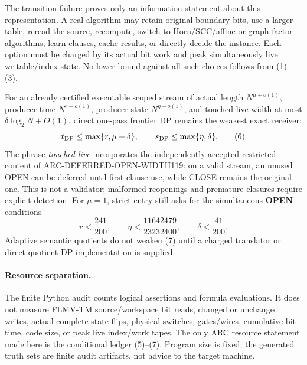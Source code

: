 \documentclass[11pt]{article}
\newcommand{\OPEN}{\textbf{OPEN}}
\begin{document}
The transition failure proves only an information statement about this
representation.  A real algorithm may retain original boundary bits, use a
larger table, reread the source, recompute, switch to Horn/SCC/affine or graph
factor algorithms, learn clauses, cache results, or directly decide the
instance.  Each option must be charged by its actual bit work and peak
simultaneously live writable/index state.  No lower bound against all such
choices follows from (1)--(3).

For an already certified executable scoped stream of actual length
$N^{\mu+o(1)}$, producer time $N^{r+o(1)}$, producer state
$N^{\eta+o(1)}$, and touched-live width at most
$\delta\log_2N+O(1)$, direct one-pass frontier DP remains the weakest exact
receiver:
\[
 t_{\rm DP}\le\max\{r,\mu+\delta\},\qquad
 s_{\rm DP}\le\max\{\eta,\delta\}.                       \tag{6}
\]
The phrase \emph{touched-live} incorporates the independently accepted
restricted content of ARC-DEFERRED-OPEN-WIDTH119: on a valid stream, an
unused OPEN can be deferred until first clause use, while CLOSE remains the
original one.  This is not a validator; malformed reopenings and premature
closures require explicit detection.  For $\mu=1$, strict entry still asks
for the simultaneous \OPEN{} conditions
\[
 r<\frac{241}{200},\qquad
 \eta<\frac{11642479}{23232400},\qquad
 \delta<\frac{41}{200}.                                  \tag{7}
\]
Adaptive semantic quotients do not weaken (7) until a charged translator or
direct quotient-DP implementation is supplied.

\paragraph{Resource separation.}
The finite Python audit counts logical assertions and formula evaluations.
It does not measure FLMV-TM source/workspace bit reads, changed or unchanged
writes, actual complete-state flips, physical switches, gates/wires,
cumulative bit-time, code size, or peak live index/work tapes.  The only ARC
resource statement made here is the conditional ledger (5)--(7).  Program
size is fixed; the generated truth sets are finite audit artifacts, not
advice to the target machine.
\end{document}
